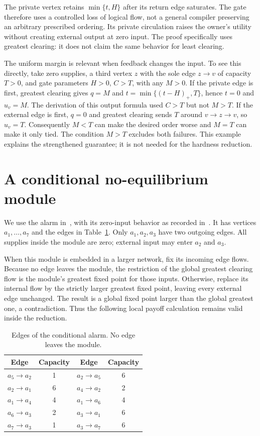 \documentclass[11pt]{article}
\begin{document}
The private vertex retains $\min\{t,H\}$ after its return edge saturates. The gate therefore uses a controlled loss of logical flow, not a general compiler preserving an arbitrary prescribed ordering. Its private circulation raises the owner's utility without creating external output at zero input. The proof specifically uses greatest clearing: it does not claim the same behavior for least clearing.

The uniform margin is relevant when feedback changes the input. To see this directly, take zero supplies, a third vertex $z$ with the sole edge $z\to v$ of capacity $T>0$, and gate parameters $H>0$, $C>T$, with any $M>0$. If the private edge is first, greatest clearing gives $q=M$ and $t=\min\{(t-H)_+,T\}$, hence $t=0$ and $u_v=M$. The derivation of this output formula used $C>T$ but not $M>T$. If the external edge is first, $q=0$ and greatest clearing sends $T$ around $v\to z\to v$, so $u_v=T$. Consequently $M<T$ can make the desired order worse and $M=T$ can make it only tied. The condition $M>T$ excludes both failures. This example explains the strengthened guarantee; it is not needed for the hardness reduction.

\section{A conditional no-equilibrium module}
We use the alarm in~\cite[Proposition~9]{bhs}, with its zero-input behavior as recorded in~\cite{progress}. It has vertices $a_1,\ldots,a_7$ and the edges in Table~\ref{tab:alarmedges}. Only $a_1,a_2,a_3$ have two outgoing edges. All supplies inside the module are zero; external input may enter $a_2$ and $a_3$.

When this module is embedded in a larger network, fix its incoming edge flows. Because no edge leaves the module, the restriction of the global greatest clearing flow is the module's greatest fixed point for those inputs. Otherwise, replace its internal flow by the strictly larger greatest fixed point, leaving every external edge unchanged. The result is a global fixed point larger than the global greatest one, a contradiction. Thus the following local payoff calculation remains valid inside the reduction.

\begin{table}[ht]
\centering
\begin{tabular}{cc@{\qquad}cc}
\toprule Edge&Capacity&Edge&Capacity\\\midrule
$a_5\to a_2$&1&$a_2\to a_5$&6\\
$a_2\to a_1$&6&$a_4\to a_2$&2\\
$a_1\to a_4$&4&$a_1\to a_6$&4\\
$a_6\to a_3$&2&$a_3\to a_1$&6\\
$a_7\to a_3$&1&$a_3\to a_7$&6\\\bottomrule
\end{tabular}
\caption{Edges of the conditional alarm. No edge leaves the module.}\label{tab:alarmedges}
\end{table}
\end{document}
